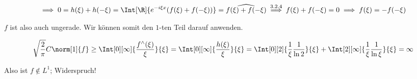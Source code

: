 \begin{solution}
\begin{enumerate}[label = \arabic*.]
    \begin{align*}
        \implies
        0
        =
        h(\xi) + h(-\xi)
        =
        \Int[\R]
        {
            e^{-i \xi x}
            (
                f(\xi)
                +
                f(-\xi)
            )
        }
        =
        \widehat{f(\xi) + f(-\xi)}
        \stackrel
        {
            \mathrm{3.2.4}
        }{\implies}
        f(\xi) + f(-\xi) = 0
        \implies
        f(\xi) = -f(-\xi)
    \end{align*}

    $f$ ist also auch ungerade.
    Wir können somit den $1$-ten Teil darauf anwenden.

    \begin{align*}
        \sqrt \frac{2}{\pi}
        C
        \norm[1]{f}
        \geq
        \Int[0][\infty]
        {
            \frac{f^\wedge(\xi)}{\xi}
        }{\xi}
        =
        \Int[0][\infty]
        {
            \frac{h(\xi)}{\xi}
        }{\xi}
        =
        \Int[0][2]
        {
            \frac{1}{\xi}
            \frac{1}{\ln 2}
        }{\xi}
        +
        \Int[2][\infty]
        {
            \frac{1}{\xi}
            \frac{1}{\ln \xi}
        }{\xi}
        =
        \infty
    \end{align*}

    Also ist $f \not \in L^1$; Widerspruch!

\end{enumerate}

\end{solution}

